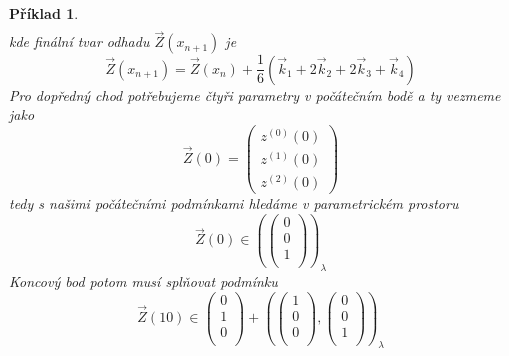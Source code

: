 \documentclass{article}
\newtheorem{example}{Příklad}
\begin{document}
\begin{example}
\begin{equation}
\begin{aligned}
        \end{aligned}
    \end{equation}
    kde finální tvar odhadu $\vec{Z}(x_{n+1})$ je
    \begin{equation}
\vec{Z}(x_{n+1}) = \vec{Z}(x_{n}) + \frac{1}{6}  \left(\vec{k}_{1} +  2\vec{k}_{2} + 2\vec{k}_{3} + \vec{k}_{4} \right)
    \end{equation}
    Pro dopředný chod potřebujeme čtyři parametry v počátečním bodě a ty vezmeme jako
    \begin{equation}
        \vec{Z}(0) = 
        \begin{pmatrix}
            z^{(0)}(0)\\
            z^{(1)}(0) \\
            z^{(2)}(0)
        \end{pmatrix} 
    \end{equation}
    tedy s našimi počátečními podmínkami hledáme v parametrickém prostoru
    \begin{equation}
        \vec{Z}(0) \in \left( 
            \begin{pmatrix}
                0 \\
                0 \\
                1 \\
            \end{pmatrix}
            \right)_{\lambda}
        \end{equation}
        Koncový bod potom musí splňovat podmínku 
        \begin{equation}
            \vec{Z}(10) \in 
            \begin{pmatrix}
                0 \\
                1 \\
                0 \\
            \end{pmatrix}  + 
            \left( 
                \begin{pmatrix} 
                    1 \\
                    0 \\
                    0 \\
                \end{pmatrix},
                \begin{pmatrix} 
                    0 \\
                    0 \\
                    1 \\
                \end{pmatrix}
            \right)_{\lambda}
        \end{equation}
    \end{example}
\end{document}
